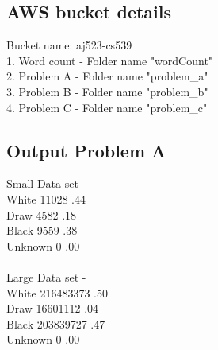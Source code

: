 \documentclass{article}
\begin{document}
\begin{titlepage}
\subsection{AWS bucket details}
Bucket name: aj523-cs539\\
1. Word count - Folder name "wordCount"\\
2. Problem A - Folder name "problem\_a"\\
3. Problem B - Folder name "problem\_b"\\
4. Problem C - Folder name "problem\_c"\\

\subsection{Output Problem A}
Small Data set - \\
White 11028 .44\\
Draw	 4582 .18\\
Black 9559 .38\\
Unknown	0 .00\\
\\
Large Data set - \\
White 216483373 .50\\
Draw	 16601112 .04\\
Black 203839727 .47\\
Unknown	0 .00\\
\end{titlepage}
\end{document}
